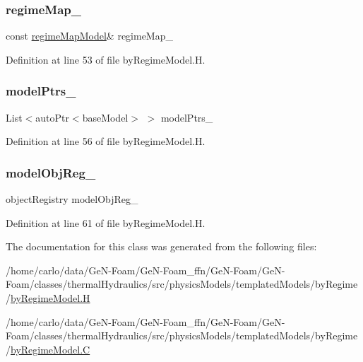 \subsubsection{\texorpdfstring{regime\+Map\+\_\+}{regimeMap\_}}
{\footnotesize\ttfamily const \hyperlink{classFoam_1_1regimeMapModel}{regime\+Map\+Model}\& regime\+Map\+\_\+\hspace{0.3cm}{\ttfamily [protected]}}



Definition at line 53 of file by\+Regime\+Model.\+H.

\mbox{\label{classFoam_1_1byRegimeModel_a01e57780b33c2287a28b5586a4d8b435}} 
\subsubsection{\texorpdfstring{model\+Ptrs\+\_\+}{modelPtrs\_}}
{\footnotesize\ttfamily List$<$auto\+Ptr$<$base\+Model$>$ $>$ model\+Ptrs\+\_\+\hspace{0.3cm}{\ttfamily [protected]}}



Definition at line 56 of file by\+Regime\+Model.\+H.

\mbox{\label{classFoam_1_1byRegimeModel_a21597c83dba846c0d71f921be0f06d1f}} 
\subsubsection{\texorpdfstring{model\+Obj\+Reg\+\_\+}{modelObjReg\_}}
{\footnotesize\ttfamily object\+Registry model\+Obj\+Reg\+\_\+\hspace{0.3cm}{\ttfamily [protected]}}



Definition at line 61 of file by\+Regime\+Model.\+H.



The documentation for this class was generated from the following files\+:\begin{DoxyCompactItemize}
\item 
/home/carlo/data/\+Ge\+N-\/\+Foam/\+Ge\+N-\/\+Foam\+\_\+ffn/\+Ge\+N-\/\+Foam/\+Ge\+N-\/\+Foam/classes/thermal\+Hydraulics/src/physics\+Models/templated\+Models/by\+Regime/\hyperlink{byRegimeModel_8H}{by\+Regime\+Model.\+H}\item 
/home/carlo/data/\+Ge\+N-\/\+Foam/\+Ge\+N-\/\+Foam\+\_\+ffn/\+Ge\+N-\/\+Foam/\+Ge\+N-\/\+Foam/classes/thermal\+Hydraulics/src/physics\+Models/templated\+Models/by\+Regime/\hyperlink{byRegimeModel_8C}{by\+Regime\+Model.\+C}\end{DoxyCompactItemize}
